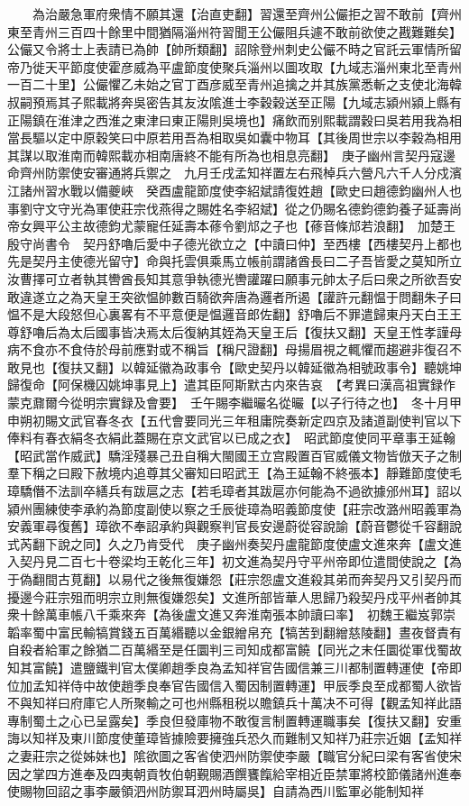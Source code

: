 　　為治嚴急軍府衆情不願其還【治直吏翻】習還至齊州公儼拒之習不敢前【齊州東至青州三百四十餘里中間猶隔淄州符習聞王公儼阻兵遽不敢前欲使之戡難難矣】公儼又令將士上表請已為帥【帥所類翻】詔除登州刺史公儼不時之官託云軍情所留帝乃徙天平節度使霍彦威為平盧節度使聚兵淄州以圖攻取【九域志淄州東北至青州一百二十里】公儼懼乙未始之官丁酉彦威至青州追擒之并其族黨悉斬之支使北海韓叔嗣預焉其子熙載將奔吳密告其友汝隂進士李穀穀送至正陽【九域志潁州潁上縣有正陽鎮在淮津之西淮之東津曰東正陽則吳境也】痛飲而别熙載謂穀曰吳若用我為相當長驅以定中原穀笑曰中原若用吾為相取吳如囊中物耳【其後周世宗以李穀為相用其謀以取淮南而韓熙載亦相南唐終不能有所為也相息亮翻】　庚子幽州言契丹寇邊命齊州防禦使安審通將兵禦之　九月壬戌孟知祥置左右飛棹兵六營凡六千人分戍濱江諸州習水戰以備夔峽　癸酉盧龍節度使李紹斌請復姓趙【歐史曰趙德鈞幽州人也事劉守文守光為軍使莊宗伐燕得之賜姓名李紹斌】從之仍賜名德鈞德鈞養子延壽尚帝女興平公主故德鈞尤蒙寵任延壽本蓚令劉邟之子也【蓚音條邟若浪翻】　加楚王殷守尚書令　契丹舒嚕后愛中子德光欲立之【中讀曰仲】至西樓【西樓契丹上都也先是契丹主使德光留守】命與托雲俱乘馬立帳前謂諸酋長曰二子吾皆愛之莫知所立汝曹擇可立者執其轡酋長知其意爭執德光轡讙躍曰願事元帥太子后曰衆之所欲吾安敢違遂立之為天皇王突欲愠帥數百騎欲奔唐為邏者所遏【讙許元翻愠于問翻朱子曰愠不是大段怒但心裏畧有不平意便是愠邏音郎佐翻】舒嚕后不罪遣歸東丹天白王王尊舒嚕后為太后國事皆决焉太后復納其姪為天皇王后【復扶又翻】天皇王性孝謹母病不食亦不食侍於母前應對或不稱旨【稱尺證翻】母揚眉視之輒懼而趨避非復召不敢見也【復扶又翻】以韓延徽為政事令【歐史契丹以韓延徽為相號政事令】聽姚坤歸復命【阿保機囚姚坤事見上】遣其臣阿斯默古内來告哀　【考異曰漢高祖實録作蒙克鼐爾今從明宗實録及會要】　壬午賜李繼曮名從曮【以子行待之也】　冬十月甲申朔初賜文武官春冬衣【五代會要同光三年租庸院奏新定四京及諸道副使判官以下俸料有春衣絹冬衣絹此蓋賜在京文武官以已成之衣】　昭武節度使同平章事王延翰【昭武當作威武】驕淫殘暴己丑自稱大閩國王立宫殿置百官威儀文物皆倣天子之制羣下稱之曰殿下赦境内追尊其父審知曰昭武王【為王延翰不終張本】靜難節度使毛璋驕僭不法訓卒繕兵有跋扈之志【若毛璋者其跋扈亦何能為不過欲據邠州耳】詔以潁州團練使李承約為節度副使以察之壬辰徙璋為昭義節度使【莊宗改潞州昭義軍為安義軍尋復舊】璋欲不奉詔承約與觀察判官長安邊蔚從容說諭【蔚音鬱從千容翻說式芮翻下說之同】久之乃肯受代　庚子幽州奏契丹盧龍節度使盧文進來奔【盧文進入契丹見二百七十卷梁均王乾化三年】初文進為契丹守平州帝即位遣間使說之【為于偽翻間古莧翻】以易代之後無復嫌怨【莊宗怨盧文進殺其弟而奔契丹又引契丹而擾邊今莊宗殂而明宗立則無復嫌怨矣】文進所部皆華人思歸乃殺契丹戍平州者帥其衆十餘萬車帳八千乘來奔【為後盧文進又奔淮南張本帥讀曰率】　初魏王繼岌郭崇韜率蜀中富民輸犒賞錢五百萬緡聽以金銀繒帛充【犒苦到翻繒慈陵翻】晝夜督責有自殺者給軍之餘猶二百萬緡至是任圜判三司知成都富饒【同光之末任圜從軍伐蜀故知其富饒】遣鹽鐵判官太僕卿趙季良為孟知祥官告國信兼三川都制置轉運使【帝即位加孟知祥侍中故使趙季良奉官告國信入蜀因制置轉運】甲辰季良至成都蜀人欲皆不與知祥曰府庫它人所聚輸之可也州縣租税以贍鎮兵十萬决不可得【觀孟知祥此語專制蜀土之心已呈露矣】季良但發庫物不敢復言制置轉運職事矣【復扶又翻】安重誨以知祥及東川節度使董璋皆據險要擁強兵恐久而難制又知祥乃莊宗近姻【孟知祥之妻莊宗之從姊妹也】隂欲圖之客省使泗州防禦使李嚴【職官分紀曰梁有客省使宋因之掌四方進奉及四夷朝貢牧伯朝覲賜酒饌饔餼給宰相近臣禁軍將校節儀諸州進奉使賜物回詔之事李嚴領泗州防禦耳泗州時屬吳】自請為西川監軍必能制知祥
